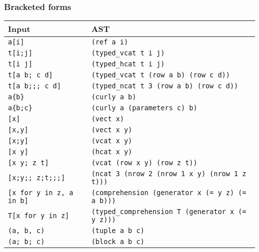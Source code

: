\hypertarget{15884526073773577025}{}


\subsubsection{Bracketed forms}




\begin{table}[h]

\begin{tabulary}{\linewidth}{|L|L|}
\hline
Input & AST \\
\hline
\texttt{a[i]} & \texttt{(ref a i)} \\
\hline
\texttt{t[i;j]} & \texttt{(typed\_vcat t i j)} \\
\hline
\texttt{t[i j]} & \texttt{(typed\_hcat t i j)} \\
\hline
\texttt{t[a b; c d]} & \texttt{(typed\_vcat t (row a b) (row c d))} \\
\hline
\texttt{t[a b;;; c d]} & \texttt{(typed\_ncat t 3 (row a b) (row c d))} \\
\hline
\texttt{a\{b\}} & \texttt{(curly a b)} \\
\hline
\texttt{a\{b;c\}} & \texttt{(curly a (parameters c) b)} \\
\hline
\texttt{[x]} & \texttt{(vect x)} \\
\hline
\texttt{[x,y]} & \texttt{(vect x y)} \\
\hline
\texttt{[x;y]} & \texttt{(vcat x y)} \\
\hline
\texttt{[x y]} & \texttt{(hcat x y)} \\
\hline
\texttt{[x y; z t]} & \texttt{(vcat (row x y) (row z t))} \\
\hline
\texttt{[x;y;; z;t;;;]} & \texttt{(ncat 3 (nrow 2 (nrow 1 x y) (nrow 1 z t)))} \\
\hline
\texttt{[x for y in z, a in b]} & \texttt{(comprehension (generator x (= y z) (= a b)))} \\
\hline
\texttt{T[x for y in z]} & \texttt{(typed\_comprehension T (generator x (= y z)))} \\
\hline
\texttt{(a, b, c)} & \texttt{(tuple a b c)} \\
\hline
\texttt{(a; b; c)} & \texttt{(block a b c)} \\
\hline
\end{tabulary}

\end{table}



\hypertarget{7735912728489467540}{}


